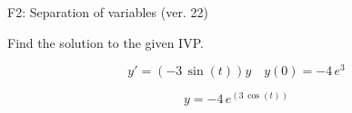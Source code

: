 \begin{exercise}
  \begin{exerciseTitle}F2: Separation of variables (ver. 22)\end{exerciseTitle}
  \begin{exerciseStatement}
    
Find the solution to the given IVP.

    
\[y'=( -3 \, \sin\left(t\right) )y\hspace{1em} y(0)= -4 \, e^{3}\]

  \end{exerciseStatement}
  \begin{exerciseAnswer}
    
\[y= -4 \, e^{\left(3 \, \cos\left(t\right)\right)}\]

  \end{exerciseAnswer}
\end{exercise}